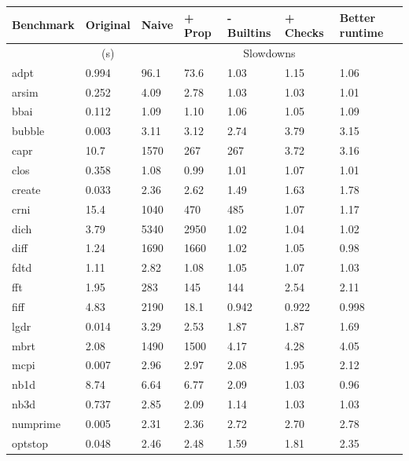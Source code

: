 \begin{table}
\begin{tabular}{| l || l || l | l | l | l | l |}
  \hline
  Benchmark & Original & Naive & + Prop & - Builtins & + Checks & Better runtime \\ \hline
            & \multicolumn{1}{c||}{(s)} & \multicolumn{5}{c|}{Slowdowns} \\ \hhline{|=||=||=|=|=|=|=|}
  adpt        & 0.994 & 96.1 & 73.6 & 1.03 & 1.15 & 1.06    \\ \hline
  arsim       & 0.252 & 4.09 & 2.78 & 1.03 & 1.03 & 1.01    \\ \hline
  bbai        & 0.112 & 1.09 & 1.10 & 1.06 & 1.05 & 1.09    \\ \hline
  bubble      & 0.003 & 3.11 & 3.12 & 2.74 & 3.79 & 3.15    \\ \hline
  capr        & 10.7  & 1570 & 267 & 267 & 3.72 & 3.16      \\ \hline
  clos        & 0.358 & 1.08 & 0.99 & 1.01 & 1.07 & 1.01    \\ \hline
  create      & 0.033 & 2.36 & 2.62 & 1.49 & 1.63 & 1.78    \\ \hline
  crni        & 15.4  & 1040 & 470  & 485  & 1.07 & 1.17    \\ \hline
  dich        & 3.79  & 5340 & 2950 & 1.02 & 1.04 & 1.02    \\ \hline
  diff        & 1.24  & 1690 & 1660 & 1.02 & 1.05 & 0.98    \\ \hline
  fdtd        & 1.11  & 2.82 & 1.08 & 1.05 & 1.07 & 1.03    \\ \hline
  fft         & 1.95  & 283  & 145  & 144  & 2.54 & 2.11    \\ \hline
  fiff        & 4.83  & 2190 & 18.1 & 0.942& 0.922& 0.998   \\ \hline
  lgdr        & 0.014 & 3.29 & 2.53 & 1.87 & 1.87 & 1.69    \\ \hline
  mbrt        & 2.08  & 1490 & 1500 & 4.17 & 4.28 & 4.05    \\ \hline
  mcpi        & 0.007 & 2.96 & 2.97 & 2.08 & 1.95 & 2.12    \\ \hline
  nb1d        & 8.74  & 6.64 & 6.77 & 2.09 & 1.03 & 0.96    \\ \hline
  nb3d        & 0.737 & 2.85 & 2.09 & 1.14 & 1.03 & 1.03    \\ \hline
  numprime    & 0.005 & 2.31 & 2.36 & 2.72 & 2.70 & 2.78    \\ \hline
  optstop     & 0.048 & 2.46 & 2.48 & 1.59 & 1.81 & 2.35    \\ \hline

\end{tabular}
\end{table}
